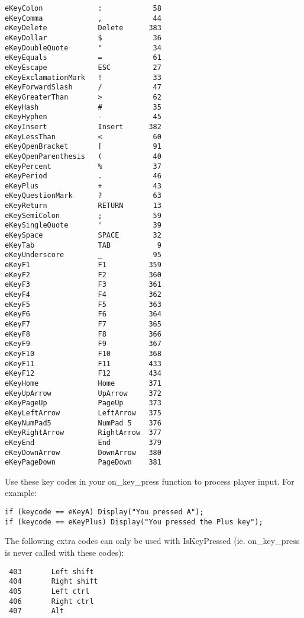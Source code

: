 \begin{verbatim}
eKeyColon             :            58
eKeyComma             ,            44
eKeyDelete            Delete      383
eKeyDollar            $            36
eKeyDoubleQuote       "            34
eKeyEquals            =            61
eKeyEscape            ESC          27
eKeyExclamationMark   !            33
eKeyForwardSlash      /            47
eKeyGreaterThan       >            62
eKeyHash              #            35
eKeyHyphen            -            45
eKeyInsert            Insert      382
eKeyLessThan          <            60
eKeyOpenBracket       [            91
eKeyOpenParenthesis   (            40
eKeyPercent           %            37
eKeyPeriod            .            46
eKeyPlus              +            43
eKeyQuestionMark      ?            63
eKeyReturn            RETURN       13
eKeySemiColon         ;            59
eKeySingleQuote       '            39
eKeySpace             SPACE        32
eKeyTab               TAB           9
eKeyUnderscore        _            95
eKeyF1                F1          359
eKeyF2                F2          360
eKeyF3                F3          361
eKeyF4                F4          362
eKeyF5                F5          363
eKeyF6                F6          364
eKeyF7                F7          365
eKeyF8                F8          366
eKeyF9                F9          367
eKeyF10               F10         368
eKeyF11               F11         433
eKeyF12               F12         434
eKeyHome              Home        371
eKeyUpArrow           UpArrow     372
eKeyPageUp            PageUp      373
eKeyLeftArrow         LeftArrow   375
eKeyNumPad5           NumPad 5    376
eKeyRightArrow        RightArrow  377
eKeyEnd               End         379
eKeyDownArrow         DownArrow   380
eKeyPageDown          PageDown    381
\end{verbatim}

Use these key codes in your on_key_press function to process player input. For example:
\begin{verbatim}
if (keycode == eKeyA) Display("You pressed A");
if (keycode == eKeyPlus) Display("You pressed the Plus key");
\end{verbatim}

The following extra codes can only be used with IsKeyPressed
(ie. on_key_press is never called with these codes):
\begin{verbatim}
 403       Left shift
 404       Right shift
 405       Left ctrl
 406       Right ctrl
 407       Alt
\end{verbatim}



